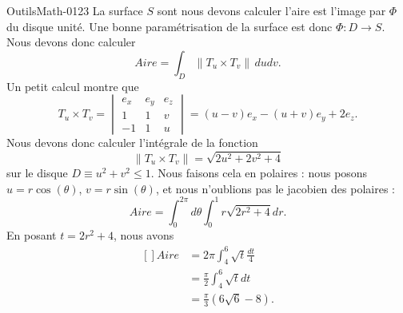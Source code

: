 \begin{corrige}{OutilsMath-0123}
    La surface \( S\) sont nous devons calculer l'aire est l'image par \( \Phi\) du disque unité. Une bonne paramétrisation de la surface est donc \( \Phi\colon D\to S\). Nous devons donc calculer
    \begin{equation}
        Aire=\int_D\| T_u\times T_v \|\,dudv.
    \end{equation}
    Un petit calcul montre que
    \begin{equation}
        T_u\times T_v=\begin{vmatrix}
            e_x    &   e_y    &   e_z    \\
            1    &   1    &   v    \\
            -1    &   1    &   u
        \end{vmatrix}=(u-v)e_x-(u+v)e_y+2e_z.
    \end{equation}
    Nous devons donc calculer l'intégrale de la fonction
    \begin{equation}
        \| T_u\times T_v \|=\sqrt{2u^2+2v^2+4}
    \end{equation}
    sur le disque \( D\equiv u^2+v^2\leq 1\). Nous faisons cela en polaires : nous posons \( u=r\cos(\theta)\), \( v=r\sin(\theta)\), et nous n'oublions pas le jacobien des polaires :
    \begin{equation}
        Aire=\int_0^{2\pi}d\theta\int_0^1r\sqrt{2r^2+4}dr.
    \end{equation}
    En posant \( t=2r^2+4\), nous avons
    \begin{equation}
        \begin{aligned}[]
            Aire&=2\pi\int_4^6\sqrt{t}\frac{ dt }{ 4 }\\
            &=\frac{ \pi }{2}\int_4^6\sqrt{t}dt\\
            &=\frac{ \pi }{ 3 }(6\sqrt{6}-8).
        \end{aligned}
    \end{equation}

\end{corrige}

